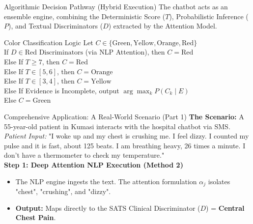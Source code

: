 \documentclass[aspectratio=169]{beamer}
\begin{document}
\begin{frame}{Algorithmic Decision Pathway (Hybrid Execution)}
	The chatbot acts as an ensemble engine, combining the Deterministic Score ($T$), Probabilistic Inference ($P$), and Textual Discriminators ($D$) extracted by the Attention Model.
	
	\begin{block}{Color Classification Logic}
		Let $C \in \{\text{Green}, \text{Yellow}, \text{Orange}, \text{Red}\}$ \\
		\vspace{0.2cm}
		If $D \in \text{Red Discriminators}$ (via NLP Attention), then $C = \text{Red}$ \\
		Else If $T \geq 7$, then $C = \text{Red}$ \\
		Else If $T \in [5, 6]$, then $C = \text{Orange}$ \\
		Else If $T \in [3, 4]$, then $C = \text{Yellow}$ \\
		Else If Evidence is Incomplete, output $\arg\max_k P(C_k \mid E)$ \\
		Else $C = \text{Green}$
	\end{block}
\end{frame}
	
	\begin{frame}{Comprehensive Application: A Real-World Scenario (Part 1)}
		\textbf{The Scenario:} A 55-year-old patient in Kumasi interacts with the hospital chatbot via SMS. 
		\vspace{0.2cm}\\
		\textit{Patient Input:} "I woke up and my chest is crushing me. I feel dizzy. I counted my pulse and it is fast, about 125 beats. I am breathing heavy, 26 times a minute. I don't have a thermometer to check my temperature."
		\vspace{0.4cm}\\
		\textbf{Step 1: Deep Attention NLP Execution (Method 2)}
		\begin{itemize}
			\item The NLP engine ingests the text. The attention formulation $\alpha_j$ isolates "chest", "crushing", and "dizzy".
			\item \textbf{Output:} Maps directly to the SATS Clinical Discriminator ($D$) = \textbf{Central Chest Pain}.
		\end{itemize}
	\end{frame}
	
\end{document}
